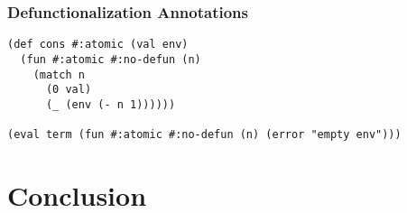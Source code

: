 \documentclass{beamer}
\newcommand{\LC}{\(\lambda\)-calculus}
\begin{document}
\begin{frame}[fragile]
  \frametitle{Defunctionalization Annotations}
  \begin{lstlisting}
(def cons #:atomic (val env)
  (fun #:atomic #:no-defun (n)
    (match n
      (0 val)
      (_ (env (- n 1))))))

(eval term (fun #:atomic #:no-defun (n) (error "empty env")))
  \end{lstlisting}
\end{frame}


\section{Conclusion}
\end{document}
